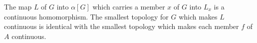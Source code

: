 The map $L$ of $G$ into $\alpha[G]$ which carries a member $x$ of $G$ into $L_x$ is a continuous homomorphism. The smallest topology for $G$ which makes $L$ continuous is identical with the smallest topology which makes each member $f$ of $A$ continuous.

